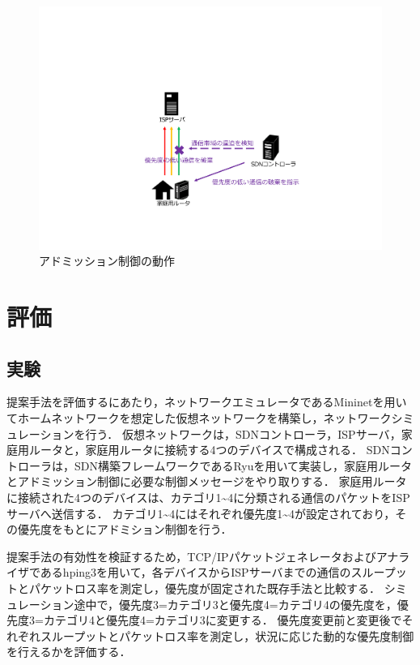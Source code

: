 \documentclass[a4paper,10pt,twocolumn,uplatex]{jsarticle}
\begin{document}
\begin{figure}[t]
	\begin{centering}
    \includegraphics[width=0.8\linewidth]{img/adomission_resume.pdf}
    \caption{アドミッション制御の動作}
    \label{fig:adomission}
    \end{centering}
\end{figure}

\section{評価}
\subsection{実験}
提案手法を評価するにあたり，ネットワークエミュレータであるMininetを用いてホームネットワークを想定した仮想ネットワークを構築し，ネットワークシミュレーションを行う．
仮想ネットワークは，SDNコントローラ，ISPサーバ，家庭用ルータと，家庭用ルータに接続する4つのデバイスで構成される．
SDNコントローラは，SDN構築フレームワークであるRyuを用いて実装し，家庭用ルータとアドミッション制御に必要な制御メッセージをやり取りする．
家庭用ルータに接続された4つのデバイスは、カテゴリ1\textasciitilde4に分類される通信のパケットをISPサーバへ送信する．
カテゴリ1\textasciitilde4にはそれぞれ優先度1\textasciitilde4が設定されており，その優先度をもとにアドミション制御を行う．\par
提案手法の有効性を検証するため，TCP/IPパケットジェネレータおよびアナライザであるhping3を用いて，各デバイスからISPサーバまでの通信のスループットとパケットロス率を測定し，優先度が固定された既存手法と比較する．
シミュレーション途中で，優先度3=カテゴリ3と優先度4=カテゴリ4の優先度を，優先度3=カテゴリ4と優先度4=カテゴリ3に変更する．
優先度変更前と変更後でそれぞれスループットとパケットロス率を測定し，状況に応じた動的な優先度制御を行えるかを評価する．
\end{document}
